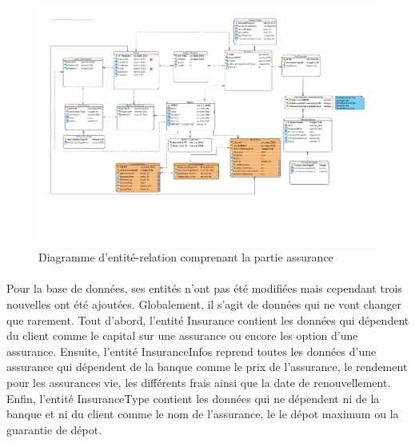 \documentclass[]{article}
\begin{document}
\begin{figure}[ht]
\centering
\includegraphics[scale=0.55]{img/BDDAssurance.pdf}
\caption{Diagramme d'entité-relation comprenant la partie assurance}
\label{fig1}
\end{figure}

\paragraph{}Pour la base de données, ses entités n’ont pas été modifiées mais cependant trois nouvelles ont été ajoutées. Globalement, il s’agit de données qui ne vont changer que rarement. Tout d’abord, l’entité Insurance contient les données qui dépendent du client comme le capital sur une assurance ou encore les option d’une assurance. Ensuite, l’entité InsuranceInfos reprend toutes les données d’une assurance qui dépendent de la banque comme le prix de l’assurance, le rendement pour les assurances vie, les différents frais ainsi que la date de renouvellement. Enfin, l’entité InsuranceType contient les données qui ne dépendent ni de la banque et ni du client comme le nom de l’assurance, le le dépot maximum ou la guarantie de dépot.
\end{document}
